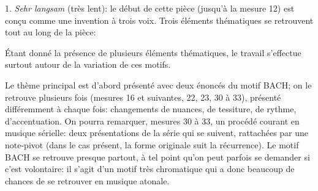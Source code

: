 \documentclass[11pt,a4paper]{scrreprt}
\begin{document}
1. \emph{Sehr langsam} (très lent): le début de cette pièce (jusqu'à la mesure 12) est conçu comme une invention à trois voix. Trois éléments thématiques se retrouvent tout au long de la pièce:

Étant donné la présence de plusieurs éléments thématiques, le travail s'effectue surtout autour de la variation de ces motifs.

Le thème principal est d'abord présenté avec deux énoncés du motif BACH; on le retrouve plusieurs fois (mesures 16 et suivantes, 22, 23, 30 à 33), présenté différemment à chaque fois: changements de nuances, de tessiture, de rythme, d'accentuation. On pourra remarquer, mesures 30 à 33, un procédé courant en musique sérielle: deux présentations de la série qui se suivent, rattachées par une note-pivot (dans le cas présent, la forme originale suit la récurrence). Le motif BACH se retrouve presque partout, à tel point qu'on peut parfois se demander si c'est volontaire: il s'agit d'un motif très chromatique qui a donc beaucoup de chances de se retrouver en musique atonale.
\end{document}
